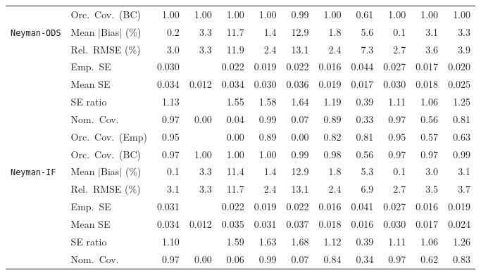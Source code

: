 \begin{landscape}
\begin{longtable}{llrrrrrrrrrr}
 & Orc.\ Cov.\ (BC) & \cellcolor{ranktwo}1.00 & \cellcolor{rankthree}1.00 & 1.00 & 1.00 & \cellcolor{rankone}0.99 & 1.00 & 0.61 & 1.00 & 1.00 & 1.00 \\
\addlinespace[2pt]
\quad \texttt{Neyman-ODS} & Mean $|$Bias$|$ (\%) & \cellcolor{ranktwo}0.2 & 3.3 & 11.7 & \cellcolor{rankthree}1.4 & 12.9 & 1.8 & 5.6 & \cellcolor{rankone}0.1 & 3.1 & 3.3 \\
 & Rel.\ RMSE (\%) & 3.0 & 3.3 & 11.9 & \cellcolor{ranktwo}2.4 & 13.1 & \cellcolor{rankone}2.4 & 7.3 & \cellcolor{rankthree}2.7 & 3.6 & 3.9 \\
 & Emp.\ SE & 0.030 &  & 0.022 & 0.019 & 0.022 & 0.016 & 0.044 & 0.027 & 0.017 & 0.020 \\
 & Mean SE & 0.034 & 0.012 & 0.034 & 0.030 & 0.036 & 0.019 & 0.017 & 0.030 & 0.018 & 0.025 \\
 & SE ratio & \cellcolor{rankthree}1.13 &  & 1.55 & 1.58 & 1.64 & 1.19 & 0.39 & \cellcolor{ranktwo}1.11 & \cellcolor{rankone}1.06 & 1.25 \\
 & Nom.\ Cov. & \cellcolor{ranktwo}0.97 & 0.00 & 0.04 & \cellcolor{rankthree}0.99 & 0.07 & 0.89 & 0.33 & \cellcolor{rankone}0.97 & 0.56 & 0.81 \\
 & Orc.\ Cov.\ (Emp) & \cellcolor{rankone}0.95 &  & 0.00 & \cellcolor{rankthree}0.89 & 0.00 & 0.82 & 0.81 & \cellcolor{ranktwo}0.95 & 0.57 & 0.63 \\
 & Orc.\ Cov.\ (BC) & \cellcolor{rankone}0.97 & 1.00 & 1.00 & 1.00 & 0.99 & 0.98 & 0.56 & \cellcolor{ranktwo}0.97 & \cellcolor{rankthree}0.97 & 0.99 \\
\addlinespace[2pt]
\quad \texttt{Neyman-IF} & Mean $|$Bias$|$ (\%) & \cellcolor{rankone}0.1 & 3.3 & 11.4 & \cellcolor{rankthree}1.4 & 12.9 & 1.8 & 5.3 & \cellcolor{ranktwo}0.1 & 3.0 & 3.1 \\
 & Rel.\ RMSE (\%) & 3.1 & 3.3 & 11.7 & \cellcolor{rankone}2.4 & 13.1 & \cellcolor{ranktwo}2.4 & 6.9 & \cellcolor{rankthree}2.7 & 3.5 & 3.7 \\
 & Emp.\ SE & 0.031 &  & 0.022 & 0.019 & 0.022 & 0.016 & 0.041 & 0.027 & 0.016 & 0.019 \\
 & Mean SE & 0.034 & 0.012 & 0.035 & 0.031 & 0.037 & 0.018 & 0.016 & 0.030 & 0.017 & 0.024 \\
 & SE ratio & \cellcolor{ranktwo}1.10 &  & 1.59 & 1.63 & 1.68 & 1.12 & 0.39 & \cellcolor{rankthree}1.11 & \cellcolor{rankone}1.06 & 1.26 \\
 & Nom.\ Cov. & \cellcolor{rankone}0.97 & 0.00 & 0.06 & \cellcolor{rankthree}0.99 & 0.07 & 0.84 & 0.34 & \cellcolor{ranktwo}0.97 & 0.62 & 0.83 \\

\end{longtable}
\end{landscape}
